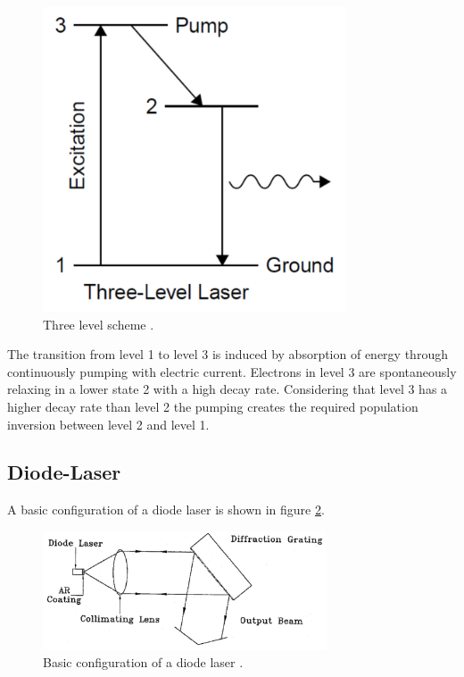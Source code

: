 \begin{figure}
  \centering
  \includegraphics[width=9cm]{threelevel.png}
  \caption{Three level scheme \cite{threelevel}.} 
  \label{fig:threelevel}
\end{figure}

\noindent
The transition from level 1 to level 3 is induced by absorption of energy through continuously pumping with electric current.
Electrons in level 3 are spontaneously relaxing in a lower state 2 with a high decay rate.
Considering that level 3 has a higher decay rate than level 2 the pumping creates the required population inversion between level 2 and level 1.


\subsection{Diode-Laser}
\noindent
A basic configuration of a diode laser is shown in figure \ref{fig:diodesetup}.

\begin{figure}
    \centering
    \includegraphics[width=0.75\textwidth]{diodesetup.png}
    \caption{Basic configuration of a diode laser \cite{V60}.} 
    \label{fig:diodesetup}
  \end{figure}

